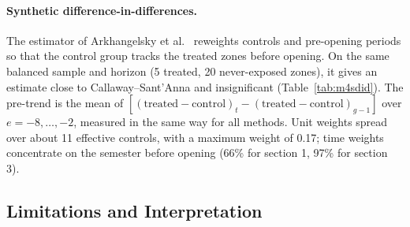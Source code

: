 \paragraph{Synthetic difference-in-differences.} The estimator of Arkhangelsky et al.\ \cite{arkhangelsky2021} reweights controls and pre-opening periods so that the control group tracks the treated zones before opening. On the same balanced sample and horizon (5 treated, 20 never-exposed zones), it gives an estimate close to Callaway--Sant'Anna and insignificant (Table~\ref{tab:m4sdid}). The pre-trend is the mean of $[(\text{treated}-\text{control})_t-(\text{treated}-\text{control})_{g-1}]$ over $e=-8,\dots,-2$, measured in the same way for all methods. Unit weights spread over about 11 effective controls, with a maximum weight of 0.17; time weights concentrate on the semester before opening (66\% for section 1, 97\% for section 3).

\begin{table}[tbhp]
\centering
\caption{Same sample and horizon: Callaway--Sant'Anna, difference-in-differences and synthetic DiD}
\label{tab:m4sdid}
\end{table}

\subsection*{Limitations and Interpretation}

